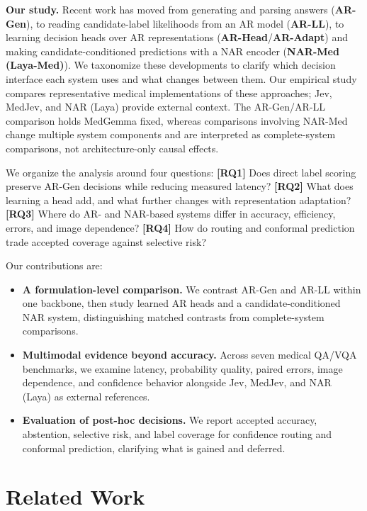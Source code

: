 \textbf{Our study.} Recent work has moved from generating and parsing answers (\textbf{AR-Gen}), to reading candidate-label likelihoods from an AR model (\textbf{AR-LL}), to learning decision heads over AR representations (\textbf{AR-Head}/\textbf{AR-Adapt}) and making candidate-conditioned predictions with a NAR encoder (\textbf{NAR-Med (Laya-Med)}). We taxonomize these developments to clarify which decision interface each system uses and what changes between them. Our empirical study compares representative medical implementations of these approaches; Jev, MedJev, and NAR (Laya) provide external context. The AR-Gen/AR-LL comparison holds MedGemma fixed, whereas comparisons involving NAR-Med change multiple system components and are interpreted as complete-system comparisons, not architecture-only causal effects.

We organize the analysis around four questions:
\textbf{[RQ1]} Does direct label scoring preserve AR-Gen decisions while reducing measured latency?
\textbf{[RQ2]} What does learning a head add, and what further changes with representation adaptation?
\textbf{[RQ3]} Where do AR- and NAR-based systems differ in accuracy, efficiency, errors, and image dependence?
\textbf{[RQ4]} How do routing and conformal prediction trade accepted coverage against selective risk?

Our contributions are:
\begin{itemize}
\item \textbf{A formulation-level comparison.} We contrast AR-Gen and AR-LL within one backbone, then study learned AR heads and a candidate-conditioned NAR system, distinguishing matched contrasts from complete-system comparisons.
\item \textbf{Multimodal evidence beyond accuracy.} Across seven medical QA/VQA benchmarks, we examine latency, probability quality, paired errors, image dependence, and confidence behavior alongside Jev, MedJev, and NAR (Laya) as external references.
\item \textbf{Evaluation of post-hoc decisions.} We report accepted accuracy, abstention, selective risk, and label coverage for confidence routing and conformal prediction, clarifying what is gained and deferred.
\end{itemize}

\section{Related Work}
\label{sec:related}

